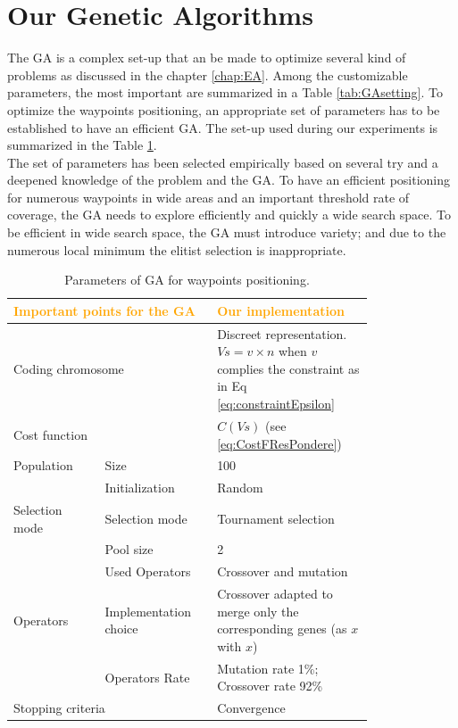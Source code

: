 \section{Our Genetic Algorithms}

The GA is a complex set-up that an be made to optimize several kind of problems as discussed in the chapter \ref{chap:EA}.
Among the customizable parameters, the most important are summarized in a Table  \ref{tab:GAsetting}.
To optimize the waypoints positioning, an appropriate set of parameters has to be established to have an efficient GA. 
The set-up used during our experiments is summarized in the Table \ref{tab:ourGA1}.\\
The set of parameters has been selected empirically based on several try and a deepened knowledge of the problem and the GA.
To have an efficient positioning for numerous waypoints in wide areas and an important threshold rate of coverage, the GA needs to explore efficiently and quickly a wide search space. To be efficient in wide search space, the GA must introduce variety; and due to the numerous local minimum the elitist selection is inappropriate.  

  	 \begin{table}
  \begin{tabular}{ | m{0.22\linewidth} | m{0.24\linewidth} |  m{0.34\linewidth} | }
     \hline  \multicolumn{2}{|l|}{ \textbf{\textcolor{orange} { Important points for the GA}}}    &  \textbf{\textcolor{orange}{Our implementation} } \tabularnewline  \hline 
	\multicolumn{2}{|l|}{ Coding chromosome }   	  & Discreet representation. $ Vs= v\times n  $ when $v$ complies the constraint as in Eq \ref{eq:constraintEpsilon}			  	    \tabularnewline \hline 
	 \multicolumn{2}{|l|}{ Cost function }  		  	& $C(Vs)$ (see \ref{eq:CostFResPondere})\tabularnewline  \hline  
	Population	 			 & Size  	    				&100	\tabularnewline \cline{2-3}  
							 & Initialization & Random    \tabularnewline \hline  
	  Selection mode      	 & Selection mode &	Tournament selection    \tabularnewline \cline{2-3}
        				 	 & Pool size  & 2  	\tabularnewline \hline
      						 & Used Operators	& Crossover and mutation 	  		\tabularnewline \cline{2-3}
      	Operators 		 & Implementation choice & Crossover adapted to merge only the corresponding genes (as $x$ with $x$)   	\tabularnewline \cline{2-3}
      						 &	Operators Rate 	 	 & Mutation rate 1\%; Crossover rate 92\% 	\tabularnewline \hline
 \multicolumn{2}{|l|}{ Stopping criteria  }  	 	 						&  Convergence\tabularnewline  \hline 

   \end{tabular}  \caption{Parameters of GA for waypoints positioning.}\label{tab:ourGA1}
\end{table}



 

